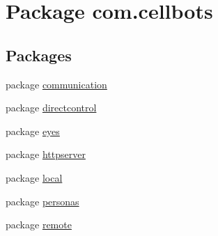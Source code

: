 \hypertarget{namespacecom_1_1cellbots}{\section{Package com.\-cellbots}
\label{namespacecom_1_1cellbots}
}
\subsection*{Packages}
\begin{DoxyCompactItemize}
\item 
package \hyperlink{namespacecom_1_1cellbots_1_1communication}{communication}
\item 
package \hyperlink{namespacecom_1_1cellbots_1_1directcontrol}{directcontrol}
\item 
package \hyperlink{namespacecom_1_1cellbots_1_1eyes}{eyes}
\item 
package \hyperlink{namespacecom_1_1cellbots_1_1httpserver}{httpserver}
\item 
package \hyperlink{namespacecom_1_1cellbots_1_1local}{local}
\item 
package \hyperlink{namespacecom_1_1cellbots_1_1personas}{personas}
\item 
package \hyperlink{namespacecom_1_1cellbots_1_1remote}{remote}
\end{DoxyCompactItemize}
